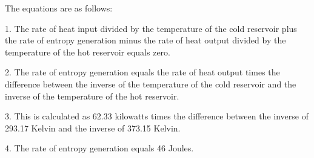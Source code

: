 The equations are as follows:

1. The rate of heat input divided by the temperature of the cold reservoir plus the rate of entropy generation minus the rate of heat output divided by the temperature of the hot reservoir equals zero.

2. The rate of entropy generation equals the rate of heat output times the difference between the inverse of the temperature of the cold reservoir and the inverse of the temperature of the hot reservoir.

3. This is calculated as 62.33 kilowatts times the difference between the inverse of 293.17 Kelvin and the inverse of 373.15 Kelvin.

4. The rate of entropy generation equals 46 Joules.